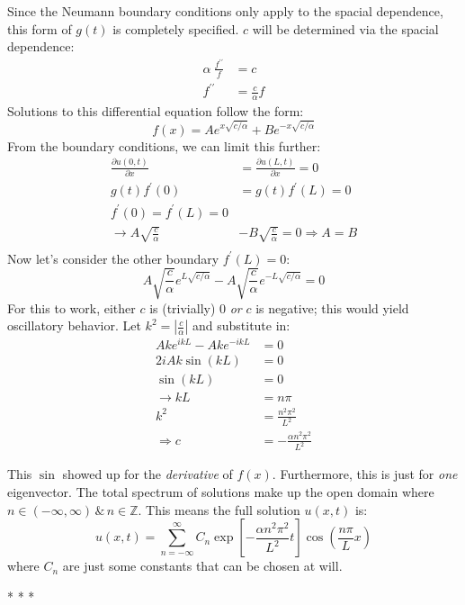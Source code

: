 \documentclass[10pt]{article}
\newcommand{\problemterm}{\begin{center}\vspace{0.25cm}* * *\vspace{1cm}\end{center}}
\newcounter{problem}
\begin{document}
{Since the Neumann boundary conditions only apply to the spacial dependence, this form of $g(t)$ is completely specified. $c$ will be determined via the spacial dependence:
\begin{align*}
  \alpha\ \frac{f^{\prime \prime}}{f} &= c \\
  f^{\prime \prime} &= \frac{c}{\alpha}f
\end{align*}
Solutions to this differential equation follow the form: \[f(x) = Ae^{x\sqrt{c/\alpha}} + Be^{-x\sqrt{c/\alpha}}\] From the boundary conditions, we can limit this further:
\begin{align*}
  \frac{\partial u(0, t)}{\partial x} &= \frac{\partial u(L, t)}{\partial x} = 0 \\
  g(t)f^{\prime}(0) &= g(t)f^{\prime}(L) = 0 \\
  f^{\prime}(0) = f^{\prime}(L) = 0 \\
  \rightarrow A\sqrt{\frac{c}{\alpha}} &- B\sqrt{\frac{c}{\alpha}} = 0 \Rightarrow A = B \\
\end{align*}
Now let's consider the other boundary $f^{\prime}(L) = 0$:
\[A\sqrt{\frac{c}{\alpha}}e^{L\sqrt{c/\alpha}} - A\sqrt{\frac{c}{\alpha}}e^{-L\sqrt{c/\alpha}}= 0\]
For this to work, either $c$ is (trivially) 0 \textit{or} $c$ is negative; this would yield oscillatory behavior. Let $k^2 = \left|\frac{c}{\alpha}\right|$ and substitute in:
\begin{align*}
  Ak e^{i kL} - Ak e^{-i kL} &= 0 \\
  2i Ak\sin(kL) &= 0 \\
  \sin(kL) &= 0 \\
  \rightarrow kL &= n\pi \\
  k^2 &= \frac{n^2 \pi^2}{L^2} \\
  \Rightarrow c &= -\frac{\alpha n^2 \pi^2}{L^2}
\end{align*}

This $\sin$ showed up for the \textit{derivative} of $f(x)$. Furthermore, this is just for \textit{one} eigenvector. The total spectrum of solutions make up the open domain where $n\in(-\infty, \infty)\,\&\,n\in\mathbb{Z}$. This means the full solution $u(x,t)$ is:
\begin{equation}
  u(x, t) = \sum_{n=-\infty}^{\infty}C_n\exp\left[-\frac{\alpha n^2 \pi^2}{L^2} t\right]\cos\left(\frac{n\pi}{L}x\right)
\end{equation}
where  $C_n$ are just some constants that can be chosen at will.

\problemterm

}
\end{document}
